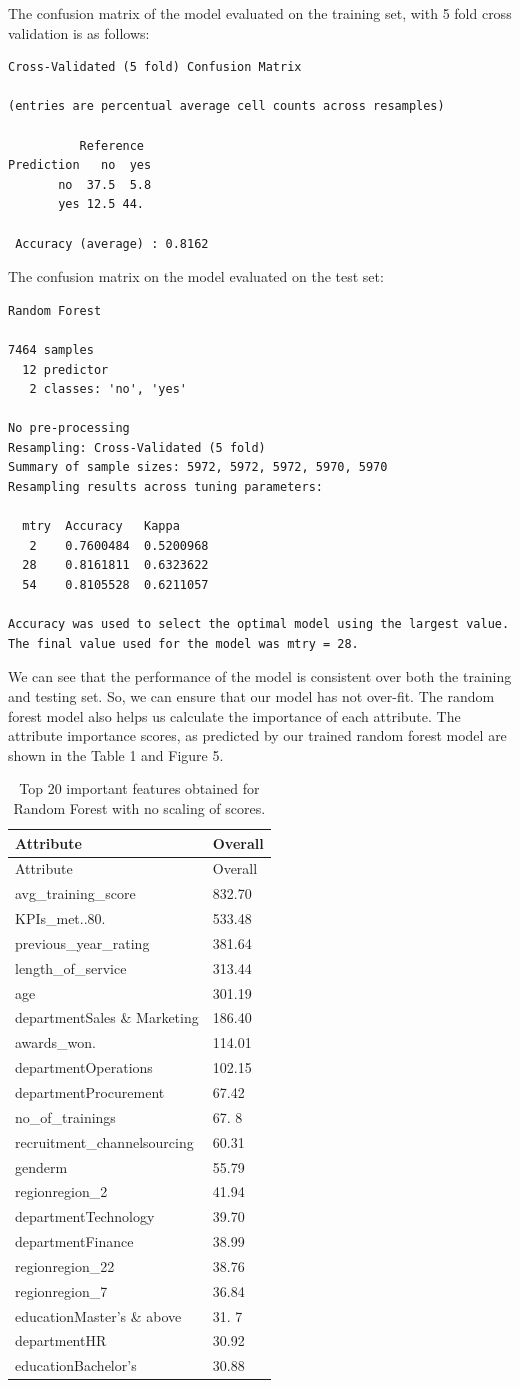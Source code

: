 \documentclass[
]{article}
\begin{document}
The confusion matrix of the model evaluated on the training set, with 5
fold cross validation is as follows:

\begin{verbatim}
Cross-Validated (5 fold) Confusion Matrix 

(entries are percentual average cell counts across resamples)
 
          Reference
Prediction   no  yes
       no  37.5  5.8
       yes 12.5 44. 
                            
 Accuracy (average) : 0.8162

\end{verbatim}

The confusion matrix on the model evaluated on the test set:

\begin{verbatim}
Random Forest 

7464 samples
  12 predictor
   2 classes: 'no', 'yes' 

No pre-processing
Resampling: Cross-Validated (5 fold) 
Summary of sample sizes: 5972, 5972, 5972, 5970, 5970 
Resampling results across tuning parameters:

  mtry  Accuracy   Kappa    
   2    0.7600484  0.5200968
  28    0.8161811  0.6323622
  54    0.8105528  0.6211057

Accuracy was used to select the optimal model using the largest value.
The final value used for the model was mtry = 28.
\end{verbatim}

We can see that the performance of the model is consistent over both the
training and testing set. So, we can ensure that our model has not
over-fit. The random forest model also helps us calculate the importance
of each attribute. The attribute importance scores, as predicted by our
trained random forest model are shown in the Table 1 and Figure 5.

\begin{longtable}[]{@{}ll@{}}
\caption{Top 20 important features obtained for Random Forest with no
scaling of scores.}\tabularnewline
\toprule
Attribute & Overall\tabularnewline
\midrule
\endfirsthead
\toprule
Attribute & Overall\tabularnewline
\midrule
\endhead
avg\_training\_score & 832.70\tabularnewline
KPIs\_met..80. & 533.48\tabularnewline
previous\_year\_rating & 381.64\tabularnewline
length\_of\_service & 313.44\tabularnewline
age & 301.19\tabularnewline
departmentSales \& Marketing & 186.40\tabularnewline
awards\_won. & 114.01\tabularnewline
departmentOperations & 102.15\tabularnewline
departmentProcurement & 67.42\tabularnewline
no\_of\_trainings & 67. 8\tabularnewline
recruitment\_channelsourcing & 60.31\tabularnewline
genderm & 55.79\tabularnewline
regionregion\_2 & 41.94\tabularnewline
departmentTechnology & 39.70\tabularnewline
departmentFinance & 38.99\tabularnewline
regionregion\_22 & 38.76\tabularnewline
regionregion\_7 & 36.84\tabularnewline
educationMaster's \& above & 31. 7\tabularnewline
departmentHR & 30.92\tabularnewline
educationBachelor's & 30.88\tabularnewline
\bottomrule
\end{longtable}
\end{document}
